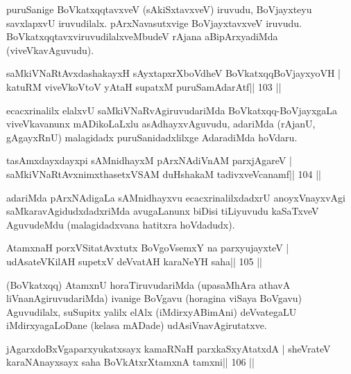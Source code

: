 \begin{artha}
puruSanige BoVkatxqqtavxveV (sAkiSxtavxveV) iruvudu, BoVjayxteyu savxlapxvU iruvudilalx. pArxNavasutxvige BoVjayxtavxveV iruvudu. BoVkatxqqtavxviruvudilalxveMbudeV rAjana aBipArxyadiMda (viveVkavAguvudu).
\end{artha}

\begin{shl}
saMkiVNaRtAvxdashakayxH sAyxtapxrXboVdheV BoVkatxqqBoVjayxyoVH |
katuRM viveVkoV\s toV yAtaH supatxM puruSamAdarAtf\hfill || 103 ||
\end{shl}

\begin{artha}
ecacxrinalilx elalxvU saMkiVNaRvAgiruvudariMda BoVkatxqq-BoVjayxgaLa viveVkavanunx mADikoLaLxlu asAdhayxvAguvudu, adariMda (rAjanU, gAgayxRnU) malagidadx puruSanidadxlilxge AdaradiMda hoVdaru.
\end{artha}

\begin{shl}
tasAmxdayxdayxpi sAMnidhayxM pArxNAdiVnAM parxjAgareV |
saMkiVNaRtAvxnimxthasetxVSAM duHshakaM tadivxveVcanamf\hfill || 104 ||
\end{shl}

\begin{artha}
adariMda pArxNAdigaLa sAMnidhayxvu ecacxrinalilxdadxrU anoyxVnayxvAgi saMkaravAgidudxdadxriMda avugaLanunx biDisi tiLiyuvudu kaSaTxveV AguvudeMdu (malagidadxvana hatitxra hoVdadudx). 
\end{artha}


\begin{shl}
AtamxnaH porxVSitatAvxtutx BoVgoV\s semxY na parxyujayxteV |
udAsateV\s KilAH supetxV deVvatAH karaNeYH saha\hfill || 105 ||
\end{shl}

\begin{artha}
(BoVkatxqq) AtamxnU horaTiruvudariMda (upasaMhAra athavA liVnanAgiruvudariMda) ivanige BoVgavu (horagina viSaya BoVgavu) Aguvudilalx, suSupitx yalilx elAlx (iMdirxyABimAni) deVvategaLU iMdirxyagaLoDane (kelasa mADade) udAsiVnavAgirutatxve. 
\end{artha}


\begin{shl}
jAgarxdoBxVgaparxyukatxsayx kamaRNaH parxkaSxyAtatxdA |
sheVrateV karaNAnayxsayx saha BoVkAtxrX\s\s tamxnA \s\s tamxni\hfill || 106 ||
\end{shl}

